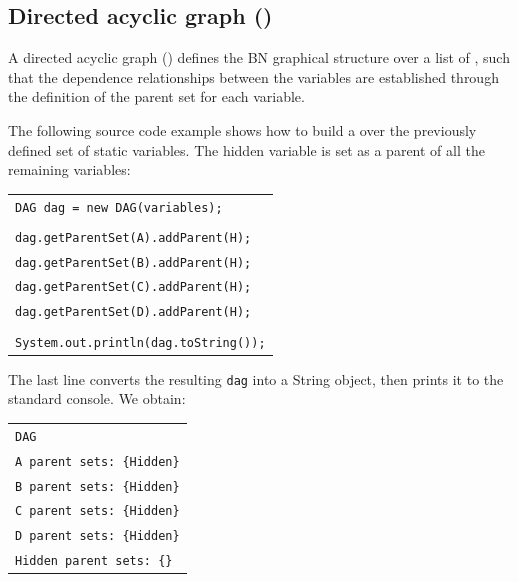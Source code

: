 \subsection{Directed acyclic graph ()}

A directed acyclic graph () defines the BN graphical structure over a list of , such that the dependence relationships between the variables are established through the definition of the parent set for each variable. 

The following source code example shows how to build a  over the previously defined set of static variables. The hidden variable is set as a parent of all the remaining variables:

\vspace{-0.1in}
\begin{table}[H]
\begin{tabular}{l} \\ \hline

        \texttt{DAG dag = new DAG(variables);}\\\\

        \texttt{dag.getParentSet(A).addParent(H);}\\
        \texttt{dag.getParentSet(B).addParent(H);}\\
        \texttt{dag.getParentSet(C).addParent(H);}\\
        \texttt{dag.getParentSet(D).addParent(H);}\\\\
        
        \texttt{System.out.println(dag.toString());}\\\hline 

\end{tabular}
\end{table}

The last line converts the resulting \texttt{dag} into a String object, then prints it to the standard console. We obtain:

\vspace{-0.1in}
\begin{table}[H]
\small{\begin{tabular}{l} \\
\texttt{DAG}\\
\texttt{A parent sets: \{Hidden\}}\\
\texttt{B parent sets: \{Hidden\}}\\
\texttt{C parent sets: \{Hidden\}}\\
\texttt{D parent sets: \{Hidden\}}\\
\texttt{Hidden parent sets: \{\}}\\
\end{tabular}}
\end{table}

